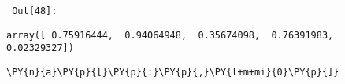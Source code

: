         {\par%
        \vspace{-1\smallerfontscale}%
        \noindent%
        \begin{minipage}{\cellleftmargin}%
    \hfill%
    {\smaller%
    \tt%
    \color{nbframe-out-prompt}%
    Out[48]:}%
    \hspace{\inputpadding}%
    \hspace{0em}%
    \hspace{3pt}%
    \end{minipage}%
        }%
    \begin{addmargin}[\cellleftmargin]{0em}%
    {\smaller%
    \vspace{-1\smallerfontscale}%
    
    
    
    \begin{verbatim}
array([ 0.75916444,  0.94064948,  0.35674098,  0.76391983,  0.02329327])
    \end{verbatim}

    
}%
    \end{addmargin}%

{\par%
\vspace{-1\baselineskip}%
}%
\begin{notebookcell}[49]%
\begin{addmargin}[\cellleftmargin]{0em}%
{\smaller%
\par%
%
\vspace{-1\smallerfontscale}%
\begin{Verbatim}[commandchars=\\\{\}]
\PY{n}{a}\PY{p}{[}\PY{p}{:}\PY{p}{,}\PY{l+m+mi}{0}\PY{p}{]}
\end{Verbatim}
%
\par%
\vspace{-1\smallerfontscale}}%
\end{addmargin}
\end{notebookcell}

\par\vspace{1\smallerfontscale}%
    
